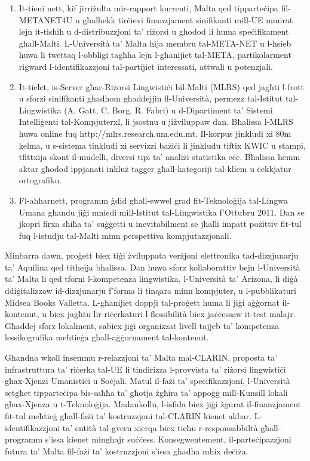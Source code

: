 \documentclass[]{../../metanetpaper}
\begin{document}
\begin{multicols}{2}
\begin{enumerate}
\item It-tieni nett, kif jirriżulta mir-rapport kurrenti, Malta qed tipparteċipa fil-METANET4U u għalhekk tirċievi finanzjament sinifikanti mill-UE mmirat lejn it-tisħiħ u d-distribuzzjoni ta’ riżorsi u għodod li huma speċifikament għall-Malti. L-Università ta’ Malta hija membru tal-META-NET u l-ħsieb huwa li twettaq l-obbligi tagħha lejn l-għanijiet tal-META, partikolarment rigward l-identifikazzjoni tal-partijiet interessati, attwali u potenzjali. 

\item It-tielet, is-Server għar-Riżorsi Lingwistiċi bil-Malti (MLRS) qed jagħti l-frott u sforzi sinifikanti għadhom għaddejjin fl-Università, permezz tal-Istitut tal-Lingwistika (A. Gatt, C. Borg, R. Fabri) u d-Dipartiment ta’ Sistemi Intelliġenti tal-Kompjuterxl, li jsostnu u jiżviluppaw dan. Bħalissa l-MLRS huwa online fuq http://mlrs.research.um.edu.mt. Il-korpus jinkludi xi 80m kelma, u s-sistema tinkludi xi servizzi bażiċi li jinkludu tiftix KWIC u stampi, tfittxija skont il-mudelli, diversi tipi ta’ analiżi statistika eċċ. Bħalissa hemm aktar għodod ippjanati inkluż tagger għall-kategoriji tal-kliem u ċekkjatur ortografiku.

\item Fl-aħħarnett, programm ġdid għall-ewwel grad fit-Teknoloġija tal-Lingwa Umana għandu jiġi mniedi mill-Istitut tal-Lingwistika f’Ottubru 2011. Dan se jkopri firxa sħiħa ta’ suġġetti u inevitabilment se jħalli impatt pożittiv fit-tul fuq l-istudju tal-Malti minn perspettiva kompjutazzjonali.
\end{enumerate}

Minbarra dawn, proġett biex tiġi żviluppata verżjoni elettronika tad-dizzjunarju ta’ Aquilina \cite{Aquilina:1987} qed titħejja bħalissa. Dan huwa sforz kollaborattiv bejn l-Università ta’ Malta li qed tforni l-kompetenza lingwistika, l-Università ta’ Arizona, li diġà ddiġitalizzaw id-dizzjunarju f’forma li tinqara minn kompjuter, u l-pubblikaturi Midsea Books Valletta. L-għanijiet doppji tal-proġett huma li jiġi aġġornat il-kontenut, u biex jagħtu lir-riċerkaturi l-flessibilità biex jaċċessaw it-test malajr. Għaddej sforz lokalment, sabiex jiġi organizzat livell tajjeb ta’ kompetenza lessikografika meħtieġa għall-aġġornament tal-kontenut.

Għandna wkoll insemmu r-relazzjoni ta’ Malta mal-CLARIN,  proposta ta’ infrastruttura ta’ riċerka tal-UE li tindirizza l-provvista ta’ riżorsi lingwistiċi għax-Xjenzi Umanistiċi u Soċjali. Matul il-fażi ta’ speċifikazzjoni, l-Università setgħet tipparteċipa bis-saħħa ta’ għotja żgħira ta’ appoġġ mill-Kunsill lokali għax-Xjenza u t-Teknoloġija. Madankollu, l-isfida biex jiġi żgurat il-finanzjament fit-tul meħtieġ għall-fażi ta’ kostruzzjoni tal-CLARIN kienet akbar. L-identifikazzjoni ta’ entità tal-gvern xierqa biex tieħu r-responsabbiltà għall-programm s’issa kienet mingħajr suċċess. Konsegwentement, il-parteċipazzjoni futura ta’ Malta fil-fażi ta’ kostruzzjoni s’issa għadha mhix deċiża.


\end{multicols}
\end{document}
